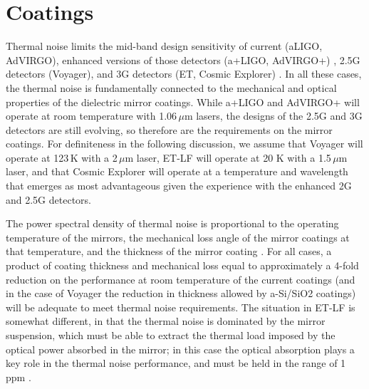 \chapter{Coatings}
\label{sec:Coatings}



Thermal noise limits the mid-band design sensitivity of current (aLIGO, AdVIRGO)\cite{AdvancedVirgo2015, AdvancedLIGO2015}, enhanced versions of those detectors (a+LIGO, AdVIRGO+) \cite{Zucker:LIGOAplus, Cagnoli:VirgoAplus}, 2.5G detectors (Voyager)\cite{VoyagerDCC2018}, and 3G detectors (ET, Cosmic Explorer) \cite{ET2011,CosmicExplorer2017}. In all these cases, the thermal noise is fundamentally connected to the mechanical and optical properties of the dielectric mirror coatings. While a+LIGO and AdVIRGO+ will operate at room temperature with 1.06\,$\mu$m lasers, the designs of the 2.5G and 3G detectors are still evolving, so therefore are the requirements on the mirror coatings. For definiteness in the following discussion, we assume that Voyager will operate at 123\,K with a 2\,$\mu$m laser, ET-LF will operate at 20 K with a 1.5\,$\mu$m laser, and that Cosmic Explorer will operate at a temperature and wavelength that emerges as most advantageous given the experience with the enhanced 2G and 2.5G detectors.

The power spectral density of thermal noise is proportional to the operating temperature of the mirrors, the mechanical loss angle of the mirror coatings at that temperature, and the thickness of the mirror coating \cite{levin1998internal}. For all cases, a product of coating thickness and mechanical loss equal to approximately a 4-fold reduction on the performance at room temperature of the current coatings (and in the case of Voyager the reduction in thickness allowed by a-Si/SiO2 coatings) will be adequate to meet thermal noise requirements. The situation in ET-LF is somewhat different, in that the thermal noise is dominated by the mirror suspension, which must be able to extract the thermal load imposed by the optical power absorbed in the mirror; in this case the optical absorption plays a key role in the thermal noise performance, and must be held in the range of 1\,ppm \cite{HiEA2011}.

